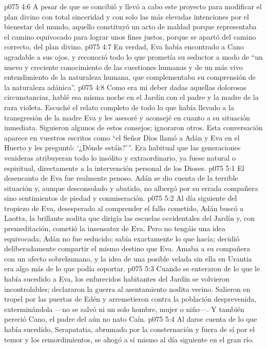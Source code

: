 \vs p075 4:6 A pesar de que se concibió y llevó a cabo este proyecto para modificar el plan divino con total sinceridad y con solo las más elevadas intenciones por el bienestar del mundo, aquello constituyó un acto de maldad porque representaba el camino equivocado para lograr unos fines justos, porque se apartó del camino correcto, del plan divino.
\vs p075 4:7 En verdad, Eva había encontrado a Cano agradable a sus ojos, y reconoció todo lo que prometía su seductor a modo de “un nuevo y creciente conocimiento de las cuestiones humanas y de un más vivo entendimiento de la naturaleza humana, que complementaba su comprensión de la naturaleza adánica”.
\vs p075 4:8 Como era mi deber dadas aquellas dolorosas circunstancias, hablé esa misma noche en el Jardín con el padre y la madre de la raza violeta. Escuché el relato completo de todo lo que había llevado a la transgresión de la madre Eva y les asesoré y aconsejé en cuanto a su situación inmediata. Siguieron algunos de estos consejos; ignoraron otros. Esta conversación aparece en vuestros escritos como “el Señor Dios llamó a Adán y Eva en el Huerto y les preguntó: ‘¿Dónde estáis?'”. Era habitual que las generaciones venideras atribuyeran todo lo insólito y extraordinario, ya fuese natural o espiritual, directamente a la intervención personal de los Dioses.
\vs p075 5:1 El desencanto de Eva fue realmente penoso. Adán se dio cuenta de la terrible situación y, aunque desconsolado y abatido, no albergó por su errada compañera sino sentimientos de piedad y conmiseración.
\vs p075 5:2 Al día siguiente del tropiezo de Eva, desesperado al comprender el fallo cometido, Adán buscó a Laotta, la brillante nodita que dirigía las escuelas occidentales del Jardín y, con premeditación, cometió la insensatez de Eva. Pero no tengáis una idea equivocada; Adán no fue seducido; sabía exactamente lo que hacía; decidió deliberadamente compartir el mismo destino que Eva. Amaba a su compañera con un afecto sobrehumano, y la idea de una posible velada sin ella en Urantia era algo más de lo que podía soportar.
\vs p075 5:3 Cuando se enteraron de lo que le había sucedido a Eva, los enfurecidos habitantes del Jardín se volvieron incontrolables; declararon la guerra al asentamiento nodita vecino. Salieron en tropel por las puertas de Edén y arremetieron contra la población desprevenida, exterminándola ---no se salvó ni un solo hombre, mujer o niño---. Y también pereció Cano, el padre del aún no nato Caín.
\vs p075 5:4 Al darse cuenta de lo que había sucedido, Serapatatia, abrumado por la consternación y fuera de sí por el temor y los remordimientos, se ahogó a sí mismo al día siguiente en el gran río.
